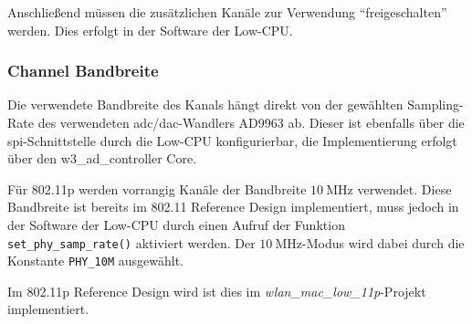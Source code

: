 \documentclass[letterpaper,11pt,ngerman]{article}
\begin{document}
\begin{onehalfspace}
Anschließend müssen die zusätzlichen Kanäle zur Verwendung
``freigeschalten'' werden. Dies erfolgt in der Software der Low-CPU.

\subsubsection{Channel Bandbreite}\label{channel-bandbreite}

Die verwendete Bandbreite des Kanals hängt direkt von der gewählten
Sampling-Rate des verwendeten \ac{adc}/\ac{dac}-Wandlers AD9963 ab.
Dieser ist ebenfalls über die \ac{spi}-Schnittstelle durch die Low-CPU
konfigurierbar, die Implementierung erfolgt über den w3\_ad\_controller
Core.

Für 802.11p werden vorrangig Kanäle der Bandbreite
\(\SI{10}{\mega\hertz}\) verwendet. Diese Bandbreite ist bereits im
802.11 Reference Design implementiert, muss jedoch in der Software der
Low-CPU durch einen Aufruf der Funktion \texttt{set\_phy\_samp\_rate()}
aktiviert werden. Der \(\SI{10}{\mega\hertz}\)-Modus wird dabei durch
die Konstante \texttt{PHY\_10M} ausgewählt.

Im 802.11p Reference Design wird ist dies im
\emph{wlan\_mac\_low\_11p}-Projekt implementiert.


\end{onehalfspace}
\end{document}
